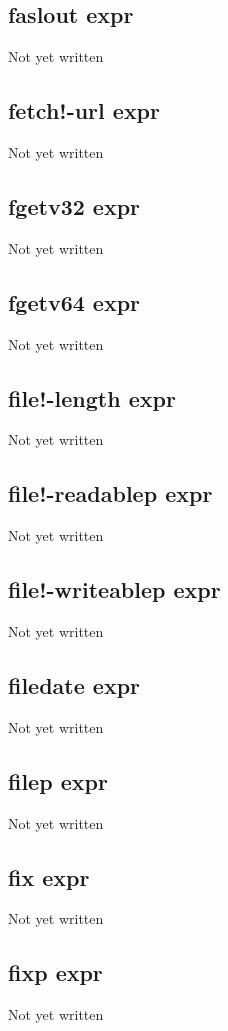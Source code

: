 \documentclass[a4paper,11pt]{article}
\begin{document}
{\subsection{\ttfamily faslout expr}
   Not yet written

\subsection{\ttfamily fetch!-url expr}
   Not yet written

\subsection{\ttfamily fgetv32 expr}
   Not yet written

\subsection{\ttfamily fgetv64 expr}
   Not yet written

\subsection{\ttfamily file!-length expr}
   Not yet written

\subsection{\ttfamily file!-readablep expr}
   Not yet written

\subsection{\ttfamily file!-writeablep expr}
   Not yet written

\subsection{\ttfamily filedate expr}
   Not yet written

\subsection{\ttfamily filep expr}
   Not yet written

\subsection{\ttfamily fix expr}
   Not yet written

\subsection{\ttfamily fixp expr}
   Not yet written

}
\end{document}
